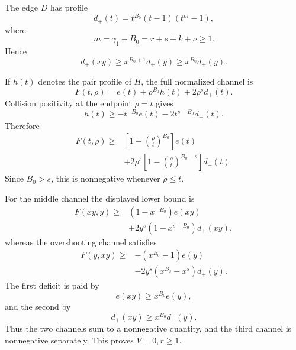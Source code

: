 \documentclass[11pt]{article}
\theoremstyle{definition}
\begin{document}
The edge \(D\) has profile
\begin{equation*}
d_+(t)=t^{B_0}(t-1)(t^m-1),
\end{equation*}
where
\begin{equation*}
m=\gamma_1-B_0=r+s+k+\nu\ge1.
\end{equation*}
Hence
\begin{equation*}
d_+(xy)\ge x^{B_0+1}d_+(y)\ge x^{B_0}d_+(y).
\end{equation*}

If \(h(t)\) denotes the pair profile of \(H\), the full normalized channel is
\begin{equation*}
F(t,\rho)
=
e(t)+\rho^{B_0}h(t)+2\rho^s d_+(t).
\end{equation*}
Collision positivity at the endpoint \(\rho=t\) gives
\begin{equation*}
h(t)
\ge
-t^{-B_0}e(t)-2t^{s-B_0}d_+(t).
\end{equation*}
Therefore
\begin{equation*}
\begin{aligned}
F(t,\rho)\ge{}&
\left[
1-\left(\frac{\rho}{t}\right)^{B_0}
\right]e(t)\\
&+
2\rho^s
\left[
1-\left(\frac{\rho}{t}\right)^{B_0-s}
\right]d_+(t).
\end{aligned}
\end{equation*}
Since \(B_0>s\), this is nonnegative whenever \(\rho\le t\).

For the middle channel the displayed lower bound is
\begin{equation*}
\begin{aligned}
F(xy,y)\ge{}&
(1-x^{-B_0})e(xy)\\
&+
2y^s(1-x^{s-B_0})d_+(xy),
\end{aligned}
\end{equation*}
whereas the overshooting channel satisfies
\begin{equation*}
\begin{aligned}
F(y,xy)\ge{}&
-(x^{B_0}-1)e(y)\\
&-
2y^s(x^{B_0}-x^s)d_+(y).
\end{aligned}
\end{equation*}
The first deficit is paid by
\begin{equation*}
e(xy)\ge x^{B_0}e(y),
\end{equation*}
and the second by
\begin{equation*}
d_+(xy)\ge x^{B_0}d_+(y).
\end{equation*}
Thus the two channels sum to a nonnegative quantity, and the third channel is nonnegative separately.  This proves \(V=0,r\ge1\).
\end{document}

